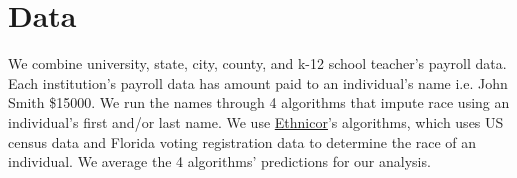 \section{Data}
\label{intro}



We combine university, state, city,  county, and k-12 school teacher's payroll data.  Each institution's payroll data has amount paid to an individual's name i.e. John Smith \$15000.  We run the names through 4 algorithms that impute race using an individual's first and/or last name.  We use \href{https://github.com/appeler/ethnicolr}{Ethnicor}'s algorithms, which uses US census data and Florida voting registration data to determine the race of an individual.  We average the 4 algorithms' predictions for our analysis.  


